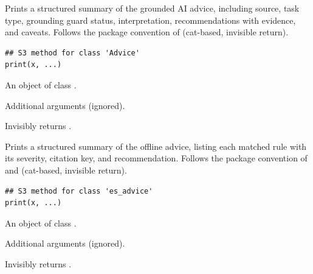 \documentclass[a4paper]{book}
\begin{document}
%
\begin{Description}
Prints a structured summary of the grounded AI advice, including source,
task type, grounding guard status, interpretation, recommendations with
evidence, and caveats. Follows the package convention of
 (cat-based, invisible return).
\end{Description}
%
\begin{Usage}
\begin{verbatim}
## S3 method for class 'Advice'
print(x, ...)
\end{verbatim}
\end{Usage}
%
\begin{Arguments}
\begin{ldescription}
\item[\code{x}] An object of class .

\item[\code{...}] Additional arguments (ignored).
\end{ldescription}
\end{Arguments}
%
\begin{Value}
Invisibly returns .
\end{Value}
%
\begin{Description}
Prints a structured summary of the offline advice, listing each matched rule
with its severity, citation key, and recommendation. Follows the package
convention of  and 
(cat-based, invisible return).
\end{Description}
%
\begin{Usage}
\begin{verbatim}
## S3 method for class 'es_advice'
print(x, ...)
\end{verbatim}
\end{Usage}
%
\begin{Arguments}
\begin{ldescription}
\item[\code{x}] An object of class .

\item[\code{...}] Additional arguments (ignored).
\end{ldescription}
\end{Arguments}
%
\begin{Value}
Invisibly returns .
\end{Value}
\end{document}
